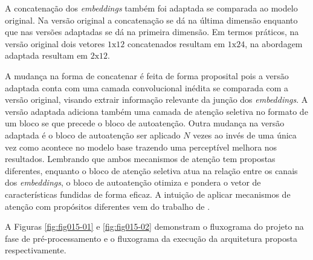 A concatenação dos \textit{embeddings} também foi adaptada se comparada ao modelo original. Na versão original a concatenação se dá na última dimensão enquanto que nas versões adaptadas se dá na primeira dimensão. Em termos práticos, na versão original dois vetores $1\text{x}12$ concatenados resultam em $1\text{x}24$, na abordagem adaptada resultam em $2\text{x}12$. 

A mudança na forma de concatenar é feita de forma proposital pois a versão adaptada conta com uma camada convolucional inédita se comparada com a versão original, visando extrair informação relevante da junção dos \textit{embeddings}. A versão adaptada adiciona também uma camada de atenção seletiva no formato de um bloco \gls{se} que precede o bloco de autoatenção. Outra mudança na versão adaptada é o bloco de autoatenção ser aplicado $N$ vezes ao invés de uma única vez como acontece no modelo base trazendo uma perceptível melhora nos resultados. Lembrando que ambos mecanismos de atenção tem propostas diferentes, enquanto o bloco de atenção seletiva atua na relação entre os canais dos \textit{embeddings}, o bloco de autoatenção otimiza e pondera o vetor de características fundidas de forma eficaz. A intuição de aplicar mecanismos de atenção com propósitos diferentes vem do trabalho de \cite{yangNeuralNetworkDesign2024a}. 

A Figuras \ref{fig:fig015-01} e \ref{fig:fig015-02} demonstram o fluxograma do projeto na fase de pré-processamento e o fluxograma da execução da arquitetura proposta respectivamente.

